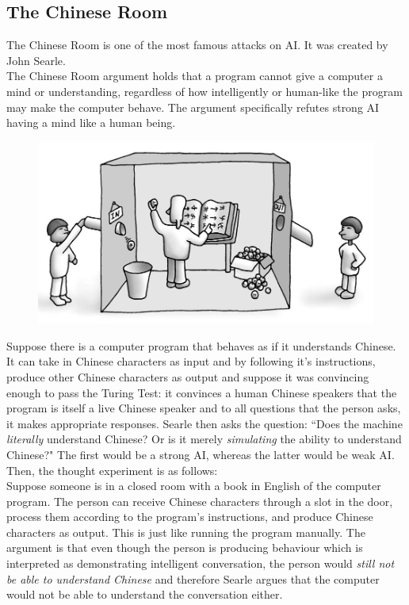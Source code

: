 \documentclass{article}
\newcommand{\n}[0]{\\[\baselineskip]}
\begin{document}
\subsection{The Chinese Room}
The Chinese Room is one of the most famous attacks on AI. It was created by John Searle. 
\n
The Chinese Room argument holds that a program cannot give a computer a mind or understanding, regardless of how intelligently or human-like the program may make the computer behave. The argument specifically refutes strong AI having a mind like a human being. 
\begin{figure}[H]
\centering
\includegraphics[width=1\textwidth, keepaspectratio]{imgs/chinese-room.jpg}
\end{figure}
\noindent
Suppose there is a computer program that behaves as if it understands Chinese. It can take in Chinese characters as input and by following it's instructions, produce other Chinese characters as output and suppose it was convincing enough to pass the Turing Test: it convinces a human Chinese speakers that the program is itself a live Chinese speaker and to all questions that the person asks, it makes appropriate responses. Searle then asks the question: ``Does the machine \textit{literally} understand Chinese? Or is it merely \textit{simulating} the ability to understand Chinese?" The first would be a strong AI, whereas the latter would be weak AI. Then, the thought experiment is as follows:
\n
Suppose someone is in a closed room with a book in English of the computer program. The person can receive Chinese characters through a slot in the door, process them according to the program's instructions, and produce Chinese characters as output. This is just like running the program manually. The argument is that even though the person is producing behaviour which is interpreted as demonstrating intelligent conversation, the person would \textit{still not be able to understand Chinese} and therefore Searle argues that the computer would not be able to understand the conversation either.
\end{document}
